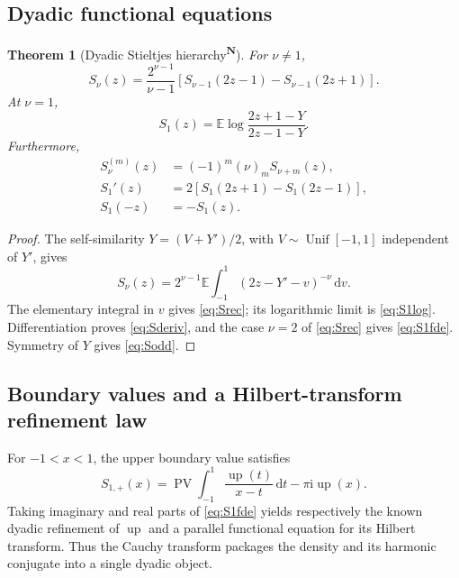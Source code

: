 \documentclass[11pt,oneside]{article}
\newtheorem{theorem}{Theorem}[section]
\theoremstyle{definition}
\theoremstyle{remark}
\newcommand{\Up}{\operatorname{up}}
\newcommand{\E}{\mathbb E}
\newcommand{\dd}{\,\mathrm d}
\newcommand{\ii}{\mathrm i}
\newcommand{\PV}{\operatorname{PV}}
\newcommand{\tagnew}{\textsuperscript{\textcolor{oliveink}{\bfseries N}}}
\begin{document}
\subsection{Dyadic functional equations}

\begin{theorem}[Dyadic Stieltjes hierarchy\tagnew]\label{thm:Snu}
For \(\nu\ne1\),
\begin{equation}\label{eq:Srec}
 \boxed{
 S_\nu(z)=\frac{2^{\nu-1}}{\nu-1}
 \left[S_{\nu-1}(2z-1)-S_{\nu-1}(2z+1)\right].}
\end{equation}
At \(\nu=1\),
\begin{equation}\label{eq:S1log}
 S_1(z)=\E\log\frac{2z+1-Y}{2z-1-Y}.
\end{equation}
Furthermore,
\begin{align}
 S_\nu^{(m)}(z)&=(-1)^m(\nu)_mS_{\nu+m}(z),\label{eq:Sderiv}\\
 S_1'(z)&=2\left[S_1(2z+1)-S_1(2z-1)\right],\label{eq:S1fde}\\
 S_1(-z)&=-S_1(z).\label{eq:Sodd}
\end{align}
\end{theorem}

\begin{proof}
The self-similarity \(Y=(V+Y')/2\), with
\(V\sim\operatorname{Unif}[-1,1]\) independent of \(Y'\), gives
\[
 S_\nu(z)=2^{\nu-1}\E\int_{-1}^1(2z-Y'-v)^{-\nu}\dd v.
\]
The elementary integral in \(v\) gives \eqref{eq:Srec}; its logarithmic limit is
\eqref{eq:S1log}.  Differentiation proves \eqref{eq:Sderiv}, and the case
\(\nu=2\) of \eqref{eq:Srec} gives \eqref{eq:S1fde}.  Symmetry of \(Y\) gives
\eqref{eq:Sodd}.
\end{proof}

\subsection{Boundary values and a Hilbert-transform refinement law}

For \(-1<x<1\), the upper boundary value satisfies
\begin{equation}\label{eq:Sboundary}
 S_{1,+}(x)=\PV\int_{-1}^1\frac{\Up(t)}{x-t}\dd t-\pi\ii\Up(x).
\end{equation}
Taking imaginary and real parts of \eqref{eq:S1fde} yields respectively the
known dyadic refinement of \(\Up\) and a parallel functional equation for its
Hilbert transform.  Thus the Cauchy transform packages the density and its
harmonic conjugate into a single dyadic object.
\end{document}
